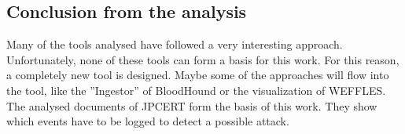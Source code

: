 \subsection{Conclusion from the analysis}
Many of the tools analysed have followed a very interesting approach. Unfortunately, none of these tools can form a basis for this work. For this reason, a completely new tool is designed. Maybe some of the approaches will flow into the tool, like the ''Ingestor'' of BloodHound or the visualization of WEFFLES. The analysed documents of JPCERT form the basis of this work. They show which events have to be logged to detect a possible attack.
